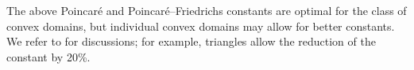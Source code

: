 \documentclass[10pt,a4paper]{article}
\newcommand{\notice}[1]{{\color{red}REMARK: #1}}
\begin{document}
\begin{remark}
\end{remark}


\begin{remark}
    The above Poincar\'e and Poincar\'e--Friedrichs constants are optimal for the class of convex domains, 
    but individual convex domains may allow for better constants.
    We refer to \cite{Liu_Kik_interp_10, Cars_Ged_Rim_expl_cnst_12, matculevich2016explicit} for discussions;
    for example, triangles allow the reduction of the constant by 20\%.
\end{remark}
\end{document}
